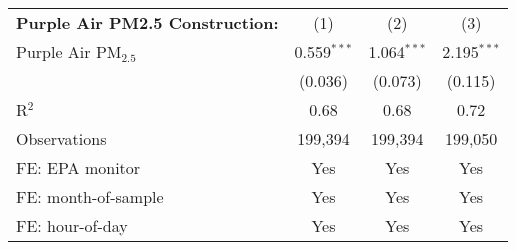 
\begin{tabular}{lccc}
\textbf{Purple Air PM2.5 Construction:} & (1) & (2) & (3)\\
Purple Air PM$_{2.5}$ & 0.559$^{***}$ & 1.064$^{***}$ & 2.195$^{***}$\\
  & (0.036) & (0.073) & (0.115)\\
R$^2$ & 0.68 & 0.68 & 0.72\\
Observations & 199,394 & 199,394 & 199,050\\
FE: EPA monitor & Yes & Yes & Yes\\
FE: month-of-sample & Yes & Yes & Yes\\
FE: hour-of-day & Yes & Yes & Yes\\
\bottomrule
\end{tabular}


